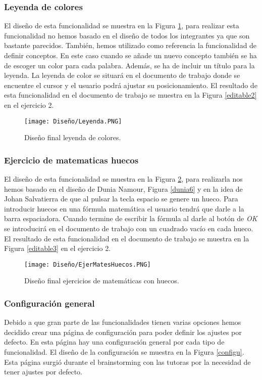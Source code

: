  \subsubsection{Leyenda de colores}
 El diseño de esta funcionalidad se muestra en la Figura \ref{LeyendaColores}, para realizar esta funcionalidad no hemos basado en el diseño de todos los integrantes ya que son bastante parecidos. También, hemos utilizado como referencia la funcionalidad de definir conceptos. En este caso cuando se añade un nuevo concepto también se ha de escoger un color para cada palabra. Además, se ha de incluir un título para la leyenda. La leyenda de color se situará en el documento de trabajo donde se encuentre el cursor y el usuario podrá ajustar su posicionamiento. El resultado de esta funcionalidad en el documento de trabajo se muestra en la Figura \ref{editable2} en el ejercicio 2.
 
\begin{figure}[ht!]
  \centering
  \texttt{[image: Diseño/Leyenda.PNG]}
  \caption{Diseño final leyenda de colores.}
  \label{LeyendaColores}
\end{figure}

 \subsubsection{Ejercicio de matematicas huecos}
 El diseño de esta funcionalidad se muestra en la Figura \ref{matesHueco}, para realizarla nos hemos basado en el diseño de Dunia Namour, Figura \ref{dunia6} y en la idea de Johan Salvatierra de que al pulsar la tecla espacio se genere un hueco. Para introducir huecos en una fórmula matemática el usuario tendrá que darle a la barra espaciadora. Cuando termine de escribir la fórmula al darle al botón de \textit{OK} se introducirá en el documento de trabajo con un cuadrado vacío en cada hueco. El resultado de esta funcionalidad en el documento de trabajo se muestra en la Figura \ref{editable3} en el ejercicio 2.

 
\begin{figure}[ht!]
  \centering
  \texttt{[image: Diseño/EjerMatesHuecos.PNG]}
  \caption{Diseño final ejercicios de matemáticas con huecos.}
  \label{matesHueco}
\end{figure}

 \subsubsection{Configuración general}
 Debido a que gran parte de las funcionalidades tienen varias opciones hemos decidido crear una página de configuración para poder definir los ajustes por defecto. En esta página hay una configuración general por cada tipo de funcionalidad. El diseño de la configuración se muestra en la Figura \ref{configu}. Esta página surgió durante el brainstorming con las tutoras por la necesidad de tener ajustes por defecto.

